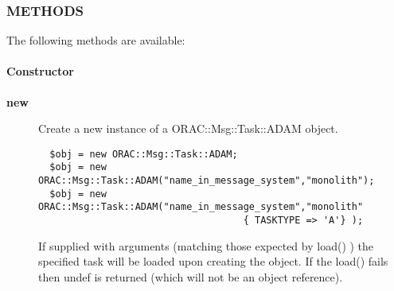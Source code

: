 \subsubsection*{METHODS\label{ORAC::Msg::Task::ADAM_METHODS}}


The following methods are available:

\paragraph*{Constructor\label{ORAC::Msg::Task::ADAM_Constructor}}
\begin{description}

\item[{\textbf{new}}] \mbox{}

Create a new instance of a ORAC::Msg::Task::ADAM object.

\begin{verbatim}
  $obj = new ORAC::Msg::Task::ADAM;
  $obj = new ORAC::Msg::Task::ADAM("name_in_message_system","monolith");
  $obj = new ORAC::Msg::Task::ADAM("name_in_message_system","monolith"
                                    { TASKTYPE => 'A'} );
\end{verbatim}


If supplied with arguments (matching those expected by load() ) the
specified task will be loaded upon creating the object. If the load()
fails then undef is returned (which will not be an object reference).

\end{description}
